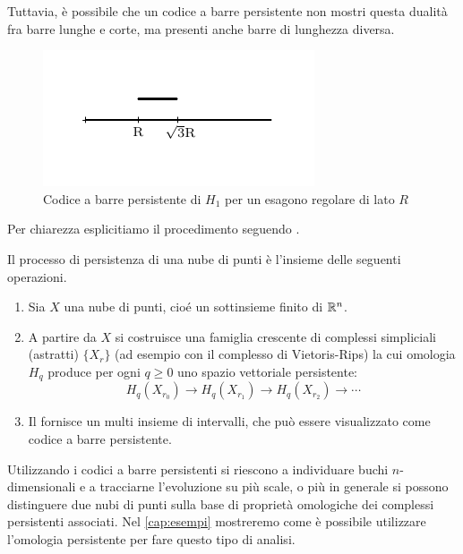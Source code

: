 Tuttavia, è possibile che un codice a barre persistente non mostri questa dualità fra barre lunghe e corte, ma presenti anche barre di lunghezza diversa.

\begin{figure}[ht]
  \includegraphics[width=.7\linewidth]{gfx/exhagon_barcode.pdf}
  \caption{Codice a barre persistente di $H_1$ per un esagono regolare di lato $R$}
  \label{fig:exhagonpersistence}
\end{figure}

Per chiarezza esplicitiamo il procedimento seguendo \cite{Curry}.
\begin{defn}
  Il processo di persistenza di una nube di punti è l'insieme delle seguenti operazioni.
  \begin{enumerate}
    \item Sia $X$ una nube di punti, cioé un sottinsieme finito di $\mathbb{R}^n$.
    \item A partire da $X$ si costruisce una famiglia crescente di complessi simpliciali (astratti) $\{X_r\}$ (ad esempio con il complesso di Vietoris-Rips) la cui omologia $H_q$ produce per ogni $q\geq 0$ uno spazio vettoriale persistente:
    \begin{equation*}
      H_q(X_{r_0}) \to H_q(X_{r_1})\to H_q(X_{r_2})\to \cdots
    \end{equation*}
    \item Il  fornisce un multi insieme di intervalli, che può essere visualizzato come codice a barre persistente.
  \end{enumerate}
\end{defn}

Utilizzando i codici a barre persistenti si riescono a individuare buchi $n$-dimensionali e a tracciarne l'evoluzione su più scale, o più in generale si possono distinguere due nubi di punti sulla base di proprietà omologiche dei complessi persistenti associati. Nel \cref{cap:esempi} mostreremo come è possibile utilizzare l'omologia persistente per fare questo tipo di analisi.

